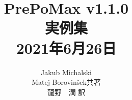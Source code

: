\documentclass[a4j,12pt,openany]{ltjsarticle}
\begin{document}
\title{{\Huge PrePoMax v1.1.0\\実例集}\\ {\small 2021年6月26日}}
\author{Jakub Michalski\\Matej Borovinšek共著\\龍野　潤 訳}
\date{}
\maketitle
\thispagestyle{empty}
\clearpage
\setcounter{tocdepth}{2}
\tableofcontents
\thispagestyle{empty}
\setcounter{page}{0}












%
\end{document}
